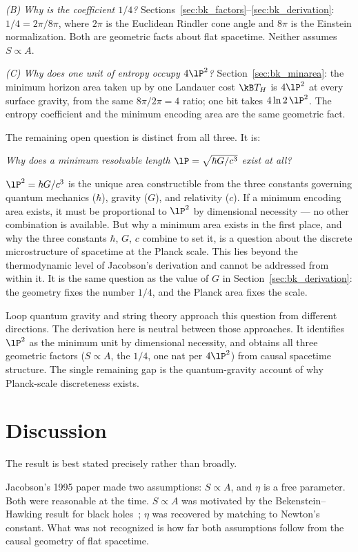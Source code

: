 \emph{(B) Why is the coefficient $1/4$?} Sections~\ref{sec:bk_factors}--\ref{sec:bk_derivation}: $1/4=2\pi/8\pi$, where $2\pi$ is the Euclidean Rindler cone angle and $8\pi$
is the Einstein normalization. Both are geometric facts about flat spacetime. Neither assumes $S\propto A$. \derived

\emph{(C) Why does one unit of entropy occupy $4\lP^2$?} Section~\ref{sec:bk_minarea}: the minimum horizon area taken up by one Landauer cost $\kB T_H$ is $4\lP^2$ at every
surface gravity, from the same $8\pi/2\pi=4$ ratio; one bit takes $4\ln2\,\lP^2$. The entropy coefficient and the minimum encoding area are the same
geometric fact. \derived

The remaining open question is distinct from all three. It is:
\begin{center}\emph{Why does a minimum resolvable length $\lP=\sqrt{\hbar G/c^3}$ exist at all?}\end{center}
$\lP^2=\hbar G/c^3$ is the unique area constructible from the three constants governing quantum mechanics ($\hbar$), gravity ($G$), and relativity ($c$). If a
minimum encoding area exists, it must be proportional to $\lP^2$ by dimensional necessity --- no other combination is available. But why a minimum area exists
in the first place, and why the three constants $\hbar$, $G$, $c$ combine to set it, is a question about the discrete microstructure of spacetime at the
Planck scale. This lies beyond the thermodynamic level of Jacobson's derivation and cannot be addressed from within it. It is the same question as the
value of $G$ in Section~\ref{sec:bk_derivation}: the geometry fixes the number $1/4$, and the Planck area fixes the scale. \openprob

Loop quantum gravity and string theory approach this question from different directions. The derivation here is neutral between those approaches. It
identifies $\lP^2$ as the minimum unit by dimensional necessity, and obtains all three geometric factors ($S\propto A$, the $1/4$, one nat per $4\lP^2$) from
causal spacetime structure. The single remaining gap is the quantum-gravity account of why Planck-scale discreteness exists.

\section{Discussion}\label{sec:bk_discussion}
The result is best stated precisely rather than broadly.

Jacobson's 1995 paper made two assumptions: $S\propto A$, and $\eta$ is a free parameter. Both were reasonable at the time. $S\propto A$ was motivated by the
Bekenstein--Hawking result for black holes~\cite{Bekenstein1973,Hawking1975}; $\eta$ was recovered by matching to Newton's constant. What was not recognized is how far both
assumptions follow from the causal geometry of flat spacetime.

